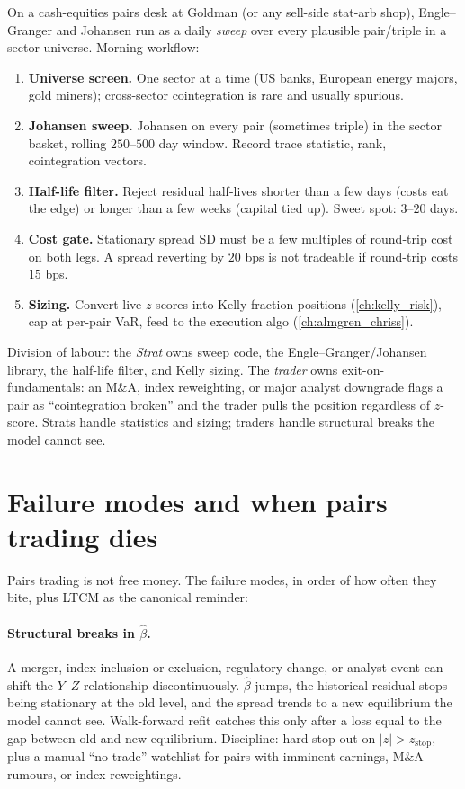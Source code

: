 \begin{gsbox}
On a cash-equities pairs desk at Goldman (or any sell-side
stat-arb shop), Engle--Granger and Johansen run as a daily
\emph{sweep} over every plausible pair/triple in a sector
universe. Morning workflow:
\begin{enumerate}
  \item \textbf{Universe screen.} One sector at a time (US banks,
  European energy majors, gold miners); cross-sector
  cointegration is rare and usually spurious.
  \item \textbf{Johansen sweep.} Johansen on every pair (sometimes
  triple) in the sector basket, rolling $250$--$500$ day window.
  Record trace statistic, rank, cointegration vectors.
  \item \textbf{Half-life filter.} Reject residual half-lives
  shorter than a few days (costs eat the edge) or longer than a
  few weeks (capital tied up). Sweet spot: $3$--$20$ days.
  \item \textbf{Cost gate.} Stationary spread SD must be a few
  multiples of round-trip cost on both legs. A spread reverting
  by $20$ bps is not tradeable if round-trip costs $15$ bps.
  \item \textbf{Sizing.} Convert live $z$-scores into
  Kelly-fraction positions (\cref{ch:kelly_risk}), cap at per-pair
  VaR, feed to the execution algo (\cref{ch:almgren_chriss}).
\end{enumerate}
Division of labour: the \emph{Strat} owns sweep code, the
Engle--Granger/Johansen library, the half-life filter, and Kelly
sizing. The \emph{trader} owns exit-on-fundamentals: an M\&A,
index reweighting, or major analyst downgrade flags a pair as
``cointegration broken'' and the trader pulls the position
regardless of $z$-score. Strats handle statistics and sizing;
traders handle structural breaks the model cannot see.
\end{gsbox}

\section{Failure modes and when pairs trading dies}
\label{sec:ch10_failure_modes}

Pairs trading is not free money. The failure modes, in order of
how often they bite, plus LTCM as the canonical reminder:

\paragraph{Structural breaks in $\hat\beta$.} A merger, index
inclusion or exclusion, regulatory change, or analyst event can
shift the $Y$--$Z$ relationship discontinuously. $\hat\beta$ jumps,
the historical residual stops being stationary at the old level,
and the spread trends to a new equilibrium the model cannot see.
Walk-forward refit catches this only after a loss equal to the
gap between old and new equilibrium. Discipline: hard stop-out on
$|z| > z_{\text{stop}}$, plus a manual ``no-trade'' watchlist for
pairs with imminent earnings, M\&A rumours, or index reweightings.

